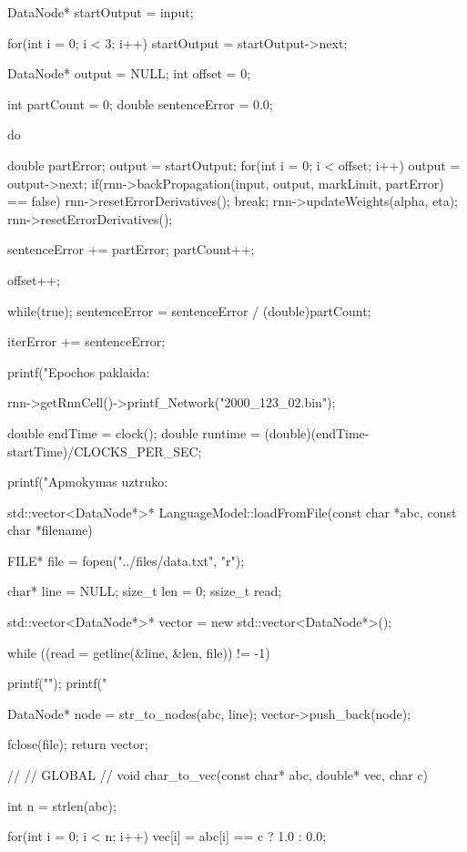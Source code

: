 {{{      DataNode* startOutput = input;

      for(int i = 0; i < 3; i++)
        startOutput = startOutput->next;


      DataNode* output = NULL;
      int offset = 0;

      int partCount = 0;
      double sentenceError = 0.0;

      do{
        double partError;
        output = startOutput;
        for(int i = 0; i < offset; i++)
          output = output->next;
        if(rnn->backPropagation(input, output, markLimit, partError) == false){
          rnn->resetErrorDerivatives();
          break;
        }
        rnn->updateWeights(alpha, eta);
        rnn->resetErrorDerivatives();

        sentenceError += partError;
        partCount++;


        offset++;
      }while(true);
      sentenceError = sentenceError / (double)partCount;

      iterError += sentenceError;
    }

     printf("Epochos paklaida: %
  }

  rnn->getRnnCell()->printf_Network("2000_123_02.bin");



  double endTime = clock();
  double runtime = (double)(endTime-startTime)/CLOCKS_PER_SEC;

  printf("Apmokymas uztruko: %


}

std::vector<DataNode*>* LanguageModel::loadFromFile(const char *abc, const char *filename){
  FILE* file = fopen("../files/data.txt", "r");

  char* line = NULL;
  size_t len = 0;
  ssize_t read;

  std::vector<DataNode*>* vector = new std::vector<DataNode*>();

  while ((read = getline(&line, &len, file)) != -1) {
    printf("\n\n");
    printf("%

    DataNode* node = str_to_nodes(abc, line);
    vector->push_back(node);


  }

  fclose(file);
  return vector;
}

//
// GLOBAL
//
void char_to_vec(const char* abc, double* vec, char c){
  int n = strlen(abc);


  for(int i = 0; i < n; i++)
    vec[i] = abc[i] == c ? 1.0 : 0.0;

}

